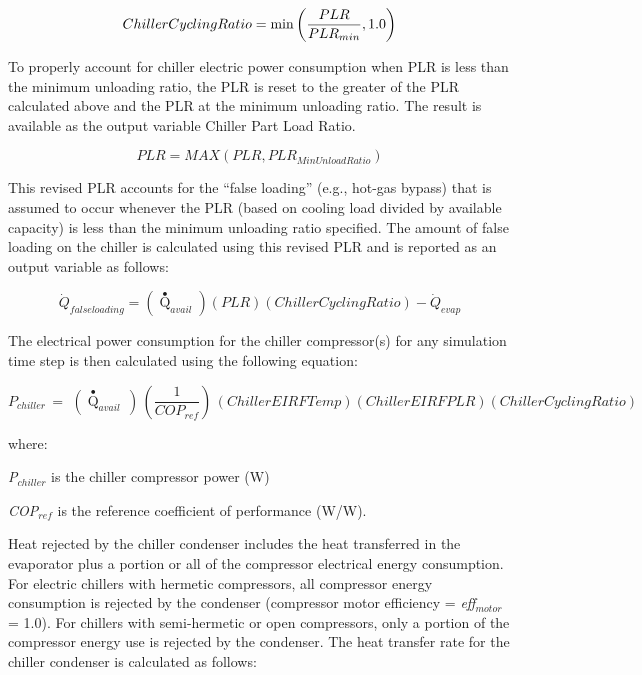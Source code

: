 \begin{equation}
  ChillerCyclingRatio = \min \left( \frac{PLR}{PLR_{min}}, 1.0 \right)
\end{equation}

To properly account for chiller electric power consumption when PLR is less than the minimum unloading ratio, the PLR is reset to the greater of the PLR calculated above and the PLR at the minimum unloading ratio. The result is available as the output variable Chiller Part Load Ratio.

\begin{equation}
PLR = MAX(PLR,PL{R_{MinUnloadRatio}})
\end{equation}

This revised PLR accounts for the ``false loading'' (e.g., hot-gas bypass) that is assumed to occur whenever the PLR (based on cooling load divided by available capacity) is less than the minimum unloading ratio specified. The amount of false loading on the chiller is calculated using this revised PLR and is reported as an output variable as follows:

\begin{equation}
{\dot{Q}_{falseloading}} = \left( {{{\mathop Q\limits^ \bullet  }_{avail}}} \right)\left( {PLR} \right)\left( {ChillerCyclingRatio} \right) - {\dot{Q}_{evap}}
\end{equation}

The electrical power consumption for the chiller compressor(s) for any simulation time step is then calculated using the following equation:

\begin{equation}
{P_{chiller}}\, = \,\,\left( {{{\mathop Q\limits^ \bullet }_{avail}}\,} \right)\,\left( {\frac{1}{{CO{P_{ref}}}}} \right)\,\left( {ChillerEIRFTemp} \right)\left( {ChillerEIRFPLR} \right)\left( {ChillerCyclingRatio} \right)
\end{equation}

where:

\emph{P\(_{chiller}\)} is the chiller compressor power (W)

\emph{COP\(_{ref}\)} is the reference coefficient of performance (W/W).

Heat rejected by the chiller condenser includes the heat transferred in the evaporator plus a portion or all of the compressor electrical energy consumption. For electric chillers with hermetic compressors, all compressor energy consumption is rejected by the condenser (compressor motor efficiency = \emph{eff\(_{motor}\)} = 1.0). For chillers with semi-hermetic or open compressors, only a portion of the compressor energy use is rejected by the condenser. The heat transfer rate for the chiller condenser is calculated as follows:

